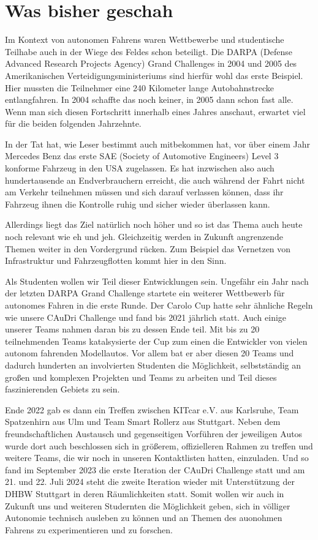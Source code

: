 \section{Was bisher geschah}
Im Kontext von autonomen Fahrens waren Wettbewerbe und studentische Teilhabe auch in der Wiege des Feldes schon beteiligt.
Die DARPA (Defense Advanced Research Projects Agency) Grand Challenges in 2004 und 2005 des Amerikanischen Verteidigungsministeriums
sind hierfür wohl das erste Beispiel. 
Hier mussten die Teilnehmer eine 240 Kilometer lange Autobahnstrecke entlangfahren. In 2004 schaffte das noch keiner, in 2005 dann schon
fast alle. Wenn man sich diesen Fortschritt innerhalb eines Jahres anschaut, erwartet viel für die beiden folgenden Jahrzehnte.

In der Tat hat, wie Leser bestimmt auch mitbekommen hat, vor über einem Jahr Mercedes Benz
das erste SAE (Society of Automotive Engineers) Level 3 konforme Fahrzeug in den USA zugelassen.
Es hat inzwischen also auch hundertausende an Endverbrauchern erreicht, die auch während der Fahrt nicht 
am Verkehr teilnehmen müssen und sich darauf verlassen können, dass ihr Fahrzeug ihnen die Kontrolle ruhig und
sicher wieder überlassen kann.

Allerdings liegt das Ziel natürlich noch höher und so ist das Thema auch heute noch relevant wie eh und jeh.
Gleichzeitig werden in Zukunft angrenzende Themen weiter in den Vordergrund rücken. Zum Beispiel das Vernetzen von Infrastruktur 
und Fahrzeugflotten kommt hier in den Sinn.

Als Studenten wollen wir Teil dieser Entwicklungen sein.
Ungefähr ein Jahr nach der letzten DARPA Grand Challenge startete ein weiterer Wettbewerb für autonomes Fahren in die erste Runde.
Der Carolo Cup hatte sehr ähnliche Regeln wie unsere CAuDri Challenge und fand bis 2021 jährlich statt.
Auch einige unserer Teams nahmen daran bis zu dessen Ende teil. 
Mit bis zu 20 teilnehmenden Teams katalsysierte der Cup zum einen die Entwickler von vielen autonom fahrenden Modellautos.
Vor allem bat er aber diesen 20 Teams und dadurch hunderten an involvierten Studenten die Möglichkeit, selbstständig
an großen und komplexen Projekten und Teams zu arbeiten und Teil dieses faszinierenden Gebiets zu sein.

Ende 2022 gab es dann ein Treffen zwischen KITcar e.V. aus Karlsruhe, Team Spatzenhirn aus Ulm und Team Smart Rollerz aus Stuttgart.
Neben dem freundschaftlichen Austausch und gegenseitigen Vorführen der jeweiligen Autos wurde dort auch beschlossen sich in größerem,
offizielleren Rahmen zu treffen und weitere Teams, die wir noch in unseren Kontaktlisten hatten, einzuladen. 
Und so fand im September 2023 die erste Iteration der CAuDri Challenge statt und am 21. und 22. Juli 2024 steht die zweite Iteration
wieder mit Unterstützung der DHBW Stuttgart in deren Räumlichkeiten statt. Somit wollen wir auch in Zukunft uns und weiteren Studernten die
Möglichkeit geben, sich in völliger Autonomie technisch ausleben zu können und an Themen des auonohmen Fahrens zu experimentieren und zu forschen.
